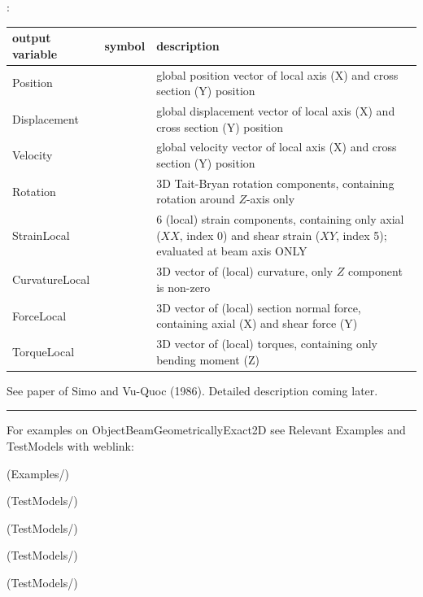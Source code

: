 :
\begin{center}
\footnotesize
\begin{longtable}{| p{5cm} | p{5cm} | p{6cm} |} 
\hline
\bf output variable & \bf symbol & \bf description \\ \hline
Position &  & global position vector of local axis (X) and cross section (Y) position\\ \hline
Displacement &  & global displacement vector of local axis (X) and cross section (Y) position\\ \hline
Velocity &  & global velocity vector of local axis (X) and cross section (Y) position\\ \hline
Rotation &  & 3D Tait-Bryan rotation components, containing rotation around $Z$-axis only\\ \hline
StrainLocal &  & 6 (local) strain components, containing only axial ($XX$, index 0) and shear strain ($XY$, index 5); evaluated at beam axis ONLY\\ \hline
CurvatureLocal &  & 3D vector of (local) curvature, only $Z$ component is non-zero\\ \hline
ForceLocal &  & 3D vector of (local) section normal force, containing axial (X) and shear force (Y)\\ \hline
TorqueLocal &  & 3D vector of (local) torques, containing only bending moment (Z)\\ \hline
\end{longtable}
\end{center}
 \noindent
    See paper of Simo and Vu-Quoc (1986).
    Detailed description coming later.
\vspace{6pt}\par\noindent\rule{\textwidth}{0.4pt}
%
\noindent For examples on ObjectBeamGeometricallyExact2D see Relevant Examples and TestModels with weblink:
\bi
\item {} (Examples/)
\item {} (TestModels/)
\item {} (TestModels/)
\item {} (TestModels/)
\item {} (TestModels/)

